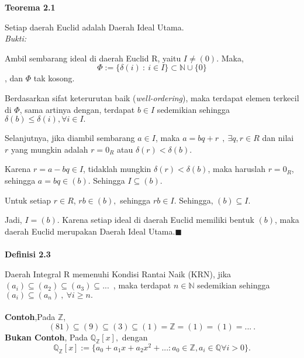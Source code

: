 \textbf{Teorema 2.1}
\par 	Setiap daerah Euclid adalah Daerah Ideal Utama.
\\
	\textit{Bukti:}
\par 	Ambil sembarang ideal di daerah Euclid R, yaitu  $I \ne (0)$. Maka, $$ \Phi := \{\delta(i)~:~i\in I\} \subset \mathbb{N} \cup \{0\} $$, dan $\Phi$ tak kosong.
\par 	Berdasarkan sifat keterurutan baik (\textit{well-ordering}), maka terdapat elemen terkecil di $\Phi$, sama artinya dengan,  terdapat $b \in I$ sedemikian sehingga $\delta(b)\le \delta(i), \forall i \in I.$
\par 	Selanjutnya, jika diambil sembarang $a \in I$, maka $a=bq+r~~,~\exists q,r \in R$ dan nilai $r$ yang mungkin adalah $r=0_R$ atau $\delta(r) < \delta(b).$
\par 	Karena  $r=a-bq \in I$, tidaklah mungkin $\delta(r) < \delta(b)$, maka haruslah $r=0_R$, sehingga $a=bq\in (b).$ Sehingga $I \subseteq (b). $
\par 	Untuk setiap $r \in R$, $rb \in (b),$ sehingga $rb \in I.$ Sehingga, $(b)\subseteq I$.
\par 	Jadi, $I=(b)$. Karena setiap ideal di daerah Euclid memiliki bentuk $(b)$, maka daerah Euclid merupakan Daerah Ideal Utama.$\blacksquare$
\\
\\
\textbf{Definisi 2.3}
\par 	Daerah Integral R memenuhi Kondisi Rantai Naik (KRN), jika $(a_i) \subseteq (a_2)\subseteq (a_3) \subseteq ...$~, maka terdapat $n \in \mathbb{N}$ sedemikian sehingga $(a_i) \subseteq (a_n)~,~ \forall i \ge n.$ 
\\
\\
\textbf{Contoh},Pada $\mathbb{Z}$,
	$$(81)\subseteq (9) \subseteq (3) \subseteq (1) = \mathbb{Z} = (1) = (1) = ...~.$$
\textbf{Bukan Contoh}, Pada $\mathbb{Q}_{\mathbb{Z}}[x],$ dengan
	$$\mathbb{Q}_{\mathbb{Z}}[x] := \{ a_0+a_1x+a_2x^2+... : a_0 \in \mathbb{Z}, a_i\in \mathbb{Q} \forall i > 0 \}.$$


